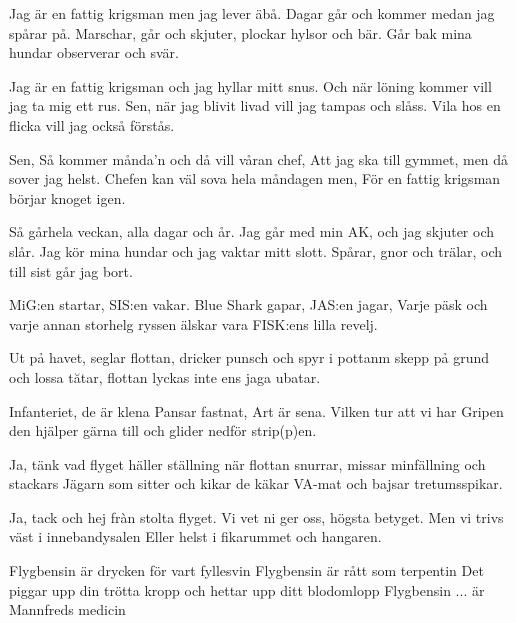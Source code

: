 
\songtext{}Jag är en fattig krigsman men jag lever äbå.
Dagar går och kommer medan jag spårar på.
Marschar, går och skjuter, plockar hylsor och bär.
Går bak mina hundar observerar och svär.

Jag är en fattig krigsman och jag hyllar mitt snus.
Och när löning kommer vill jag ta mig ett rus.
Sen, när jag blivit livad vill jag tampas och slåss.
Vila hos en flicka vill jag också förstås.

Sen, Så kommer månda'n och då vill våran chef,
Att jag ska till gymmet, men då sover jag helst.
Chefen kan väl sova hela måndagen men,
För en fattig krigsman börjar knoget igen.

Så gårhela veckan, alla dagar och år.
Jag går med min AK, och jag skjuter och slår.
Jag kör mina hundar och jag vaktar mitt slott.
Spårar, gnor och trälar, och till sist går jag bort.




\songtext{}MiG:en startar, SIS:en vakar.
Blue Shark gapar, JAS:en jagar,
Varje päsk och varje annan storhelg
ryssen älskar vara FISK:ens lilla revelj.

Ut pả havet, seglar flottan,
dricker punsch och spyr i pottanm
skepp pả grund och lossa tătar,
flottan lyckas inte ens jaga ubatar.

Infanteriet, de är klena
Pansar fastnat, Art är sena.
Vilken tur att vi har Gripen
den hjälper gärna till och glider nedför strip(p)en.

Ja, tänk vad flyget häller ställning
när flottan snurrar, missar minfällning 
och stackars Jägarn som sitter och kikar
de käkar VA-mat och bajsar tretumsspikar.

Ja, tack och hej fràn stolta flyget.
Vi vet ni ger oss, högsta betyget.
Men vi trivs väst i innebandysalen
Eller helst i fikarummet och hangaren.


\songtext{}Flygbensin är drycken för vart fyllesvin
Flygbensin är rått som terpentin
Det piggar upp din trötta kropp
och hettar upp ditt blodomlopp
Flygbensin ...
är Mannfreds medicin

